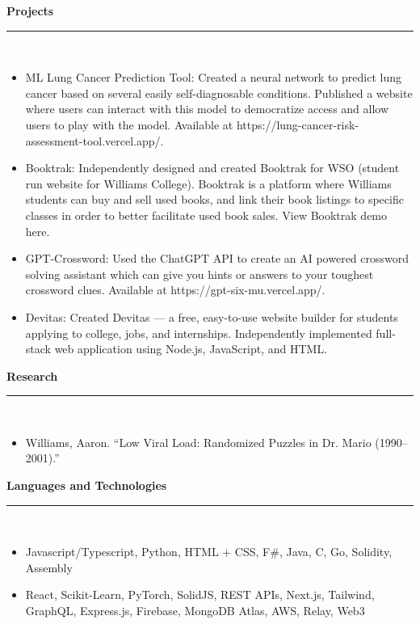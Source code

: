 \documentclass[10pt]{article}
\begin{document}
\textbf{Projects}\\[-2ex]
\rule{\textwidth}{0.4pt}\\ 
\vspace{-\baselineskip}
\begin{itemize}[itemsep=0pt, topsep=0pt]
\item ML Lung Cancer Prediction Tool: Created a neural network to predict lung cancer based on several easily self-diagnosable conditions. Published a website where users can interact with this model to democratize access and allow users to play with the model. Available at https://lung-cancer-risk-assessment-tool.vercel.app/.
\item Booktrak: Independently designed and created Booktrak for WSO (student run website for Williams College). Booktrak is a platform where Williams students can buy and sell used books, and link their book listings to specific classes in order to better facilitate used book sales. View Booktrak demo here.
\item GPT-Crossword: Used the ChatGPT API to create an AI powered crossword solving assistant which can give you hints or answers to your toughest crossword clues. Available at https://gpt-six-mu.vercel.app/.
\item Devitas: Created Devitas — a free, easy-to-use website builder for students applying to college, jobs, and internships. Independently implemented full-stack web application using Node.js, JavaScript, and HTML.
\end{itemize}
\textbf{Research}\\[-2ex]
\rule{\textwidth}{0.4pt}\\ 
\vspace{-\baselineskip}
\begin{itemize}[itemsep=0pt, topsep=0pt]
\item Williams, Aaron. “Low Viral Load: Randomized Puzzles in Dr. Mario (1990–2001).”
\end{itemize}
\textbf{Languages and Technologies}\\[-2ex]
\rule{\textwidth}{0.4pt}\\ 
\vspace{-\baselineskip}
\begin{itemize}[itemsep=0pt, topsep=0pt]
\item Javascript/Typescript, Python, HTML + CSS, F\#, Java, C, Go, Solidity, Assembly
\item React, Scikit-Learn, PyTorch, SolidJS, REST APIs, Next.js, Tailwind, GraphQL, Express.js, Firebase, MongoDB Atlas, AWS, Relay, Web3
\end{itemize}
\end{document}
